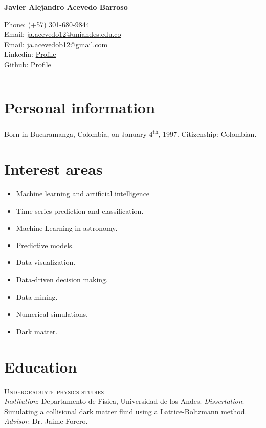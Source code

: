 \documentclass[11pt, a4paper]{article}
\newcommand{\years}[1]{\marginnote{\scriptsize #1}}
\begin{document}
\begin{center}{\huge \bf Javier Alejandro Acevedo Barroso}\\[1cm]\end{center}
\begin{minipage}[t]{0.465\textwidth}
  Phone: (+57) 301-680-9844 \\
  Email: \href{mailto:ja.acevedo12@uniandes.edu.co}{ja.acevedo12@uniandes.edu.co}\\
  Email: \href{mailto:ja.acevedob12@gmail.com}{ja.acevedob12@gmail.com}\\
  Linkedin: \href{https://www.linkedin.com/in/javier-alejandro-acevedo-barroso-494155203/}{Profile}\\
  Github: \href{https://github.com/clarkguilty}{Profile}\\
\end{minipage}

\hrule

\section*{Personal information}
Born in Bucaramanga, Colombia, on January 4\textsuperscript{th}, 1997. Citizenship: Colombian.

\section*{Interest areas}
\begin{itemize}
\item Machine learning and artificial intelligence
\item Time series prediction and classification.
\item Machine Learning in astronomy.
\item Predictive models.
\item Data visualization.
\item Data-driven decision making.
\item Data mining.
\item Numerical simulations.
\item Dark matter.


\end{itemize}

\section*{Education}
\noindent
\years{2015-2019}\textsc{Undergraduate physics studies}\\ {\emph{Institution}}: Departamento de Física, Universidad de los Andes. {\emph{Dissertation}}: Simulating a collisional dark matter fluid using a Lattice-Boltzmann method. {\emph{Advisor}}: Dr. Jaime Forero.\\
\end{document}
